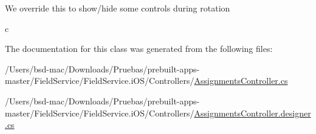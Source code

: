 We override this to show/hide some controls during rotation 

c 

The documentation for this class was generated from the following files\+:\begin{DoxyCompactItemize}
\item 
/\+Users/bsd-\/mac/\+Downloads/\+Pruebas/prebuilt-\/apps-\/master/\+Field\+Service/\+Field\+Service.\+i\+O\+S/\+Controllers/\hyperlink{_assignments_controller_8cs}{Assignments\+Controller.\+cs}\item 
/\+Users/bsd-\/mac/\+Downloads/\+Pruebas/prebuilt-\/apps-\/master/\+Field\+Service/\+Field\+Service.\+i\+O\+S/\+Controllers/\hyperlink{_assignments_controller_8designer_8cs}{Assignments\+Controller.\+designer.\+cs}\end{DoxyCompactItemize}
